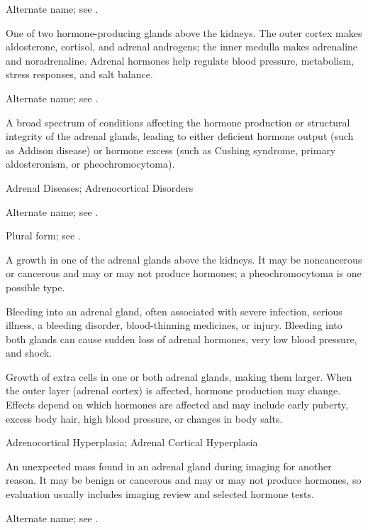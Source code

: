  Alternate name; see .

 One of two hormone-producing glands above the kidneys. The outer cortex makes aldosterone, cortisol, and adrenal androgens; the inner medulla makes adrenaline and noradrenaline. Adrenal hormones help regulate blood pressure, metabolism, stress responses, and salt balance.

 Alternate name; see .

 A broad spectrum of conditions affecting the hormone production or structural integrity of the adrenal glands, leading to either deficient hormone output (such as Addison disease) or hormone excess (such as Cushing syndrome, primary aldosteronism, or pheochromocytoma).

\synonyms
Adrenal Diseases; Adrenocortical Disorders

 Alternate name; see .

 Plural form; see .

 A growth in one of the adrenal glands above the kidneys. It may be noncancerous or cancerous and may or may not produce hormones; a pheochromocytoma is one possible type.

 Bleeding into an adrenal gland, often associated with severe infection, serious illness, a bleeding disorder, blood-thinning medicines, or injury. Bleeding into both glands can cause sudden loss of adrenal hormones, very low blood pressure, and shock.

 Growth of extra cells in one or both adrenal glands, making them larger. When the outer layer (adrenal cortex) is affected, hormone production may change. Effects depend on which hormones are affected and may include early puberty, excess body hair, high blood pressure, or changes in body salts.

\synonyms
Adrenocortical Hyperplasia; Adrenal Cortical Hyperplasia

 An unexpected mass found in an adrenal gland during imaging for another reason. It may be benign or cancerous and may or may not produce hormones, so evaluation usually includes imaging review and selected hormone tests.

 Alternate name; see .

